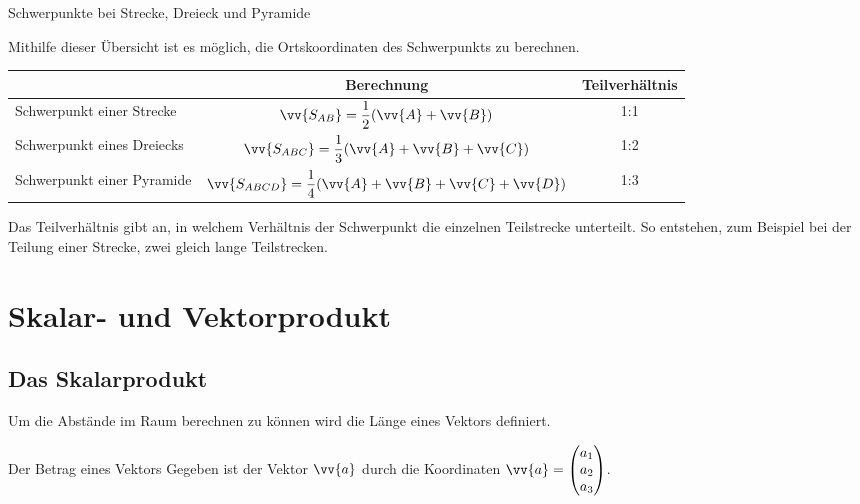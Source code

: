 \begin{merke}{Schwerpunkte bei Strecke, Dreieck und Pyramide}{}
\begin{center}
Mithilfe dieser Übersicht ist es möglich, die Ortskoordinaten des Schwerpunkts zu berechnen.\\[0.5cm]
\bgroup
\def\arraystretch{1.5}%
\begin{tabular}{|l|c|c|}
    \hline
    & Berechnung & Teilverhältnis \\[0.2cm]
     \hline
     \hline
     Schwerpunkt einer Strecke & $\vv{S_{AB}} = \dfrac{1}{2}(\vv{A} + \vv{B})$ & 1:1\\[0.2cm]
     \hline
     Schwerpunkt eines Dreiecks &$ \vv{S_{ABC}} = \dfrac{1}{3} (\vv{A} + \vv{B} + \vv{C})$ & 1:2\\[0.2cm]
     \hline
     Schwerpunkt einer Pyramide & $\vv{S_{ABCD}} = \dfrac{1}{4}(\vv{A} + \vv{B} +\vv{C} + \vv{D})$ & 1:3\\[0.2cm]
     \hline
\end{tabular}
\egroup
\end{center}
Das Teilverhältnis gibt an, in welchem Verhältnis der Schwerpunkt die einzelnen Teilstrecke unterteilt. So entstehen, zum Beispiel bei der Teilung einer Strecke, zwei gleich lange Teilstrecken.
\end{merke}
\section{Skalar- und Vektorprodukt}
\subsection{Das Skalarprodukt}
Um die Abstände im Raum berechnen zu können wird die Länge eines Vektors definiert.
\begin{defi}{Der Betrag eines Vektors}{}
Gegeben ist der Vektor $\vv{a}$ durch die Koordinaten $\vv{a} = \begin{pmatrix} a_1 \\a_2 \\a_3\end{pmatrix} $. 
\end{defi}